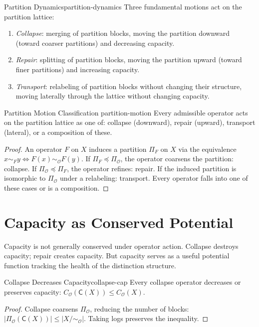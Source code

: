 \documentclass[12pt,twoside,openright]{book}
\newcommand{\obs}{\mathcal{O}}
\providecommand{\partitionObs}{\Pi_{\obs}}
\providecommand{\quotientObs}{X/{\sim_{\obs}}}
\providecommand{\capObs}[1]{C_{\obs}(#1)}
\providecommand{\collapOp}{\mathsf{C}}
\begin{document}
\begin{definition}{Partition Dynamics}{partition-dynamics}
Three fundamental motions act on the partition lattice:
\begin{enumerate}[nosep,label=(\roman*)]
\item \emph{Collapse}: merging of partition blocks, moving
  the partition downward (toward coarser partitions) and
  decreasing capacity.
\item \emph{Repair}: splitting of partition blocks, moving the
  partition upward (toward finer partitions) and increasing
  capacity.
\item \emph{Transport}: relabeling of partition blocks without
  changing their structure, moving laterally through the
  lattice without changing capacity.
\end{enumerate}
\end{definition}

\begin{proposition}{Partition Motion Classification}%
  {partition-motion}
Every admissible operator acts on the partition lattice as one
of: collapse (downward), repair (upward), transport (lateral),
or a composition of these.
\begin{proof}
An operator $F$ on $X$ induces a partition $\Pi_F$ on $X$ via
the equivalence $x\sim_F y\Leftrightarrow F(x)\sim_\obs F(y)$.
If $\Pi_F\preceq\partitionObs$, the operator coarsens the
partition: collapse. If $\partitionObs\preceq\Pi_F$, the
operator refines: repair. If the induced partition is
isomorphic to $\partitionObs$ under a relabeling: transport.
Every operator falls into one of these cases or is a
composition.
\end{proof}
\end{proposition}

\section{Capacity as Conserved Potential}

Capacity is not generally conserved under operator action.
Collapse destroys capacity; repair creates capacity. But
capacity serves as a useful potential function tracking the
health of the distinction structure.

\begin{theorem}{Collapse Decreases Capacity}{collapse-cap}
Every collapse operator decreases or preserves capacity:
$C_\obs(\collapOp(X))\le\capObs{X}$.
\begin{proof}
Collapse coarsens $\partitionObs$, reducing the number of
blocks: $|\Pi_{\obs}(\collapOp(X))|\le|\quotientObs|$.
Taking logs preserves the inequality.
\end{proof}
\end{theorem}
\end{document}
